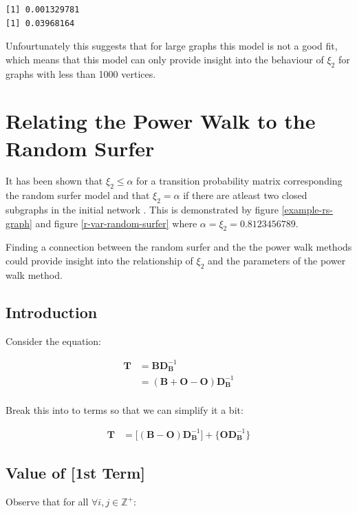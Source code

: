 \documentclass[11pt]{article}
\begin{document}
\begin{verbatim}
[1] 0.001329781
[1] 0.03968164
\end{verbatim}


Unfourtunately this suggests that for large graphs this model is not a good fit,
which means that this model can only provide insight into the behaviour of
\(\xi_{2}\) for graphs with less than 1000 vertices.

\section{Relating the Power Walk to the Random Surfer}
\label{relate-to-random-surfer}
It has been shown that \(\xi_{2} \leq \alpha\) for a transition probability matrix corresponding the random surfer model and that \(\xi_{2} = \alpha\) if there are atleast two closed subgraphs in the initial network \cite{haveliwalaSecondEigenvalueGoogle2003}. This is demonstrated by figure \ref{example-rs-graph} and figure \ref{r-var-random-surfer} where \(\alpha = \xi_{2} = 0.8123456789\).

Finding a connection between the random surfer and the the power walk methods could provide insight into the relationship of \(\xi_{2}\) and the parameters of the power walk method.

\subsection{Introduction}
\label{sec:org364dc1b}
Consider the equation:


\begin{align*}
\mathbf{T}&= \mathbf{B}\mathbf{D}_{\mathbf{B}}^{- 1} \\
&= \left( \mathbf{B}+  \mathbf{O} - \mathbf{O} \right) \mathbf{D}_{\mathbf{B}}^{- 1} \\
\end{align*}


Break this into to terms so that we can simplify it a bit:


\begin{align*}
    \mathbf{T} &= \Bigg[ \left( \mathbf{B}- \mathbf{O} \right)\mathbf{D}_{\mathbf{B}}^{- 1} \Bigg] + \Bigg\{  \mathbf{O}\mathbf{D}_{\mathbf{B}}^{- 1} \Bigg\}
\end{align*}
\subsection{Value of [1st Term]}
\label{value-of-1st-term}
Observe that for all \(\forall i,j\in \mathbb{Z}^+\):
\end{document}
